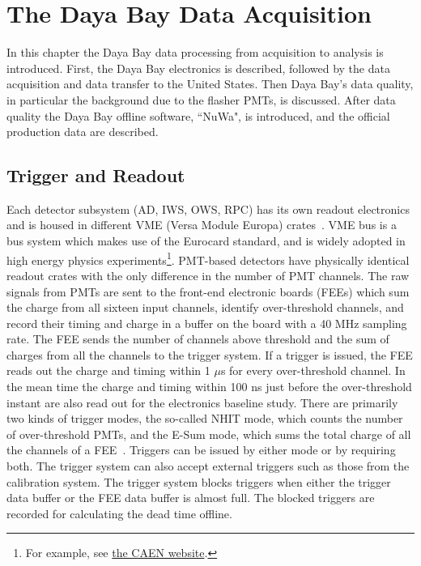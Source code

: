 \chapter{The Daya Bay Data Acquisition}

In this chapter the Daya Bay data processing from acquisition to analysis is introduced. First, the Daya Bay electronics is described, followed by the data acquisition and data transfer to the United States. Then Daya Bay's data quality, in particular the background due to the flasher PMTs, is discussed. After data quality the Daya Bay offline software, ``NuWa", is introduced, and the official production data are described.

\section{Trigger and Readout}
Each detector subsystem (AD, IWS, OWS, RPC) has its own readout electronics and is housed in different VME (Versa Module Europa) crates~\cite{VME1985}. VME bus is a bus system which makes use of the Eurocard standard, and is widely adopted in high energy physics experiments\footnote{For example, see \href{http://www.caen.it/csite/Product.jsp?parent=11}{the CAEN website}.}. PMT-based detectors have physically identical readout crates with the only difference in the number of PMT channels. The raw signals from PMTs are sent to the front-end electronic boards (FEEs) which sum the charge from all sixteen input channels, identify over-threshold channels, and record their timing and charge in a buffer on the board with a 40 MHz sampling rate. The FEE sends the number of channels above threshold and the sum of charges from all the channels to the trigger system. If a trigger is issued, the FEE reads out the charge and timing within 1 $\mu$s for every over-threshold channel. In the mean time the charge and timing within 100 ns just before the over-threshold instant are also read out for the electronics baseline study. There are primarily two kinds of trigger modes, the so-called NHIT mode, which counts the number of over-threshold PMTs, and the E-Sum mode, which sums the total charge of all the channels of a FEE~\cite{Gong2011}. Triggers can be issued by either mode or by requiring both. The trigger system can also accept external triggers such as those from the calibration system. The trigger system blocks triggers when either the trigger data buffer or the FEE data buffer is almost full. The blocked triggers are recorded for calculating the dead time offline.

